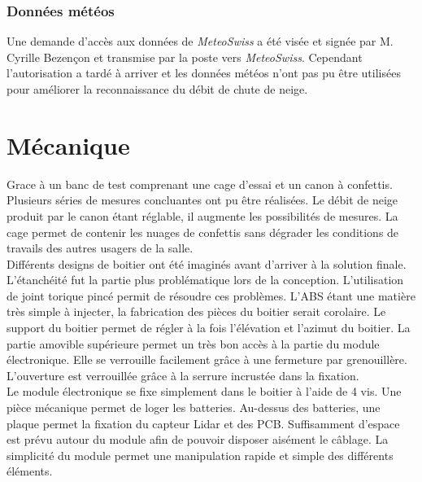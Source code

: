 \subsubsection{Données météos}
Une demande d'accès aux données de \emph{MeteoSwiss} a été visée et signée par M. Cyrille Bezençon et transmise
par la poste vers \emph{MeteoSwiss}. Cependant l'autorisation a tardé à arriver et les données météos
n'ont pas pu être utilisées pour améliorer la reconnaissance du débit de chute de neige.

\section{Mécanique}
Grace à un banc de test comprenant une cage d’essai et un canon à confettis. Plusieurs séries de mesures 
concluantes ont pu être réalisées. Le débit de neige produit par le canon étant réglable, il augmente les 
possibilités de mesures. La cage permet de contenir les nuages de confettis sans dégrader les conditions 
de travails des autres usagers de la salle.\\
Différents designs de boitier ont été imaginés avant d’arriver à la solution finale. L’étanchéité fut la 
partie plus problématique lors de la conception. L’utilisation de joint torique pincé permit de résoudre 
ces problèmes. L’ABS étant une matière très simple à injecter, la fabrication des pièces du boitier serait 
corolaire. Le support du boitier permet de régler à la fois l’élévation et l’azimut du boitier. La partie 
amovible supérieure permet un très bon accès à la partie du module électronique. Elle se verrouille facilement 
grâce à une fermeture par grenouillère. L’ouverture est verrouillée grâce à la serrure incrustée dans la 
fixation.\\
Le module électronique se fixe simplement dans le boitier à l’aide de 4 vis. Une pièce mécanique permet 
de loger les batteries. Au-dessus des batteries, une plaque permet la fixation du capteur Lidar 
et des PCB. Suffisamment d’espace est prévu autour du module afin de pouvoir disposer aisément le câblage. 
La simplicité du module permet une manipulation rapide et simple des différents éléments.